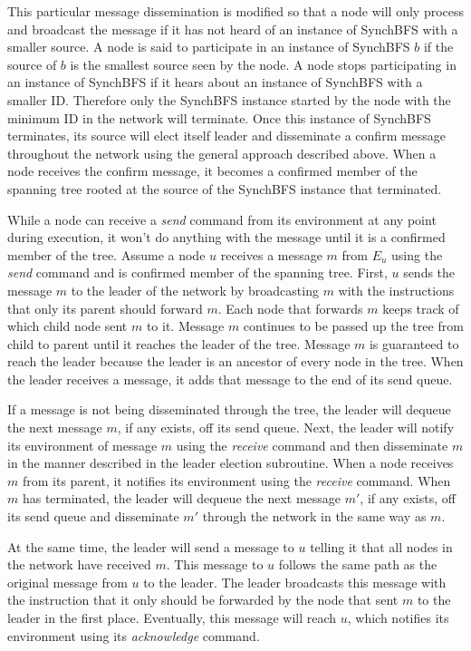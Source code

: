 \documentclass[english]{article}
\begin{document}
This particular message dissemination is modified so that a node will only process and broadcast the message if it has not heard of an instance of SynchBFS with a smaller source. A node is said to participate in an instance of SynchBFS $b$ if the source of $b$ is the smallest source seen by the node. A node stops participating in an instance of SynchBFS if it hears about an instance of SynchBFS with a smaller ID. Therefore only the SynchBFS instance started by the node with the minimum ID in the network will terminate. Once this instance of SynchBFS terminates, its source will elect itself leader and disseminate a confirm message throughout the network using the general approach described above. When a node receives the confirm message, it becomes a confirmed member of the spanning tree rooted at the source of the SynchBFS instance that terminated. 

While a node can receive a \textit{send} command from its environment at any point during execution, it won't do anything with the message until it is a confirmed member of the tree. Assume a node $u$ receives a message $m$ from $E_u$ using the \textit{send} command and is confirmed member of the spanning tree. First, $u$ sends the message $m$ to the leader of the network by broadcasting $m$ with the instructions that only its parent should forward $m$. Each node that forwards $m$ keeps track of which child node sent $m$ to it. Message $m$ continues to be passed up the tree from child to parent until it reaches the leader of the tree. Message $m$ is guaranteed to reach the leader because the leader is an ancestor of every node in the tree. When the leader receives a message, it adds that message to the end of its send queue.

If a message is not being disseminated through the tree, the leader will dequeue the next message $m$, if any exists, off its send queue. Next, the leader will notify its environment of message $m$ using the \textit{receive} command and then disseminate $m$ in the manner described in the leader election subroutine. When a node receives $m$ from its parent, it notifies its environment using the \textit{receive} command. When $m$ has terminated, the leader will dequeue the next message $m'$, if any exists, off its send queue and disseminate $m'$ through the network in the same way as $m$. 

At the same time, the leader will send a message to $u$ telling it that all nodes in the network have received $m$. This message to $u$ follows the same path as the original message from $u$ to the leader. The leader broadcasts this message with the instruction that it only should be forwarded by the node that sent $m$ to the leader in the first place. Eventually, this message will reach $u$, which notifies its environment using its \textit{acknowledge} command.
\end{document}
